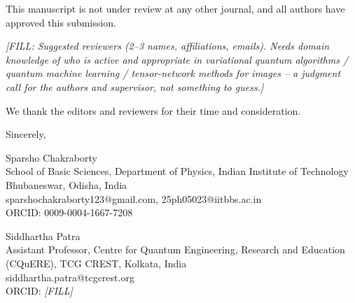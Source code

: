 \documentclass[11pt]{article}
\begin{document}
\smallskip
\noindent This manuscript is not under review at any other journal, and all authors have approved this submission.

\bigskip
\noindent \emph{[FILL: Suggested reviewers (2--3 names, affiliations, emails). Needs domain knowledge of who is active and appropriate in variational quantum algorithms / quantum machine learning / tensor-network methods for images -- a judgment call for the authors and supervisor, not something to guess.]}

\bigskip
\noindent We thank the editors and reviewers for their time and consideration.

\bigskip
\noindent Sincerely,

\bigskip
\noindent Sparsho Chakraborty \\
School of Basic Sciences, Department of Physics, Indian Institute of Technology Bhubaneswar, Odisha, India \\
sparshochakraborty123@gmail.com, 25ph05023@iitbbs.ac.in \\
ORCID: 0009-0004-1667-7208

\bigskip
\noindent Siddhartha Patra \\
Assistant Professor, Centre for Quantum Engineering, Research and Education (CQuERE), TCG CREST, Kolkata, India \\
siddhartha.patra@tcgcrest.org \\
ORCID: \emph{[FILL]}
\end{document}

